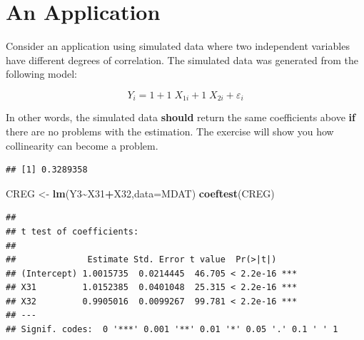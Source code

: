 \documentclass[
]{book}
\newenvironment{Shaded}{\begin{snugshade}}{\end{snugshade}}
\newcommand{\AttributeTok}[1]{\textcolor[rgb]{0.13,0.29,0.53}{#1}}
\newcommand{\CommentTok}[1]{\textcolor[rgb]{0.56,0.35,0.01}{\textit{#1}}}
\newcommand{\FunctionTok}[1]{\textcolor[rgb]{0.13,0.29,0.53}{\textbf{#1}}}
\newcommand{\NormalTok}[1]{#1}
\newcommand{\OtherTok}[1]{\textcolor[rgb]{0.56,0.35,0.01}{#1}}
\newcommand{\SpecialCharTok}[1]{\textcolor[rgb]{0.81,0.36,0.00}{\textbf{#1}}}
\begin{document}
\section{An Application}\label{an-application-1}

Consider an application using simulated data where two independent variables have different degrees of correlation. The simulated data was generated from the following model:

\[Y_i = 1 + 1 \;X_{1i} + 1\; X_{2i} + \varepsilon_i\]

In other words, the simulated data \textbf{should} return the same coefficients above \textbf{if} there are no problems with the estimation. The exercise will show you how collinearity can become a problem.

\begin{Shaded}
\end{Shaded}

\begin{verbatim}
## [1] 0.3289358
\end{verbatim}

\begin{Shaded}
\begin{Highlighting}[]
\NormalTok{CREG }\OtherTok{\textless{}{-}} \FunctionTok{lm}\NormalTok{(Y3}\SpecialCharTok{\textasciitilde{}}\NormalTok{X31}\SpecialCharTok{+}\NormalTok{X32,}\AttributeTok{data=}\NormalTok{MDAT)}
\FunctionTok{coeftest}\NormalTok{(CREG)}
\end{Highlighting}
\end{Shaded}

\begin{verbatim}
## 
## t test of coefficients:
## 
##              Estimate Std. Error t value  Pr(>|t|)    
## (Intercept) 1.0015735  0.0214445  46.705 < 2.2e-16 ***
## X31         1.0152385  0.0401048  25.315 < 2.2e-16 ***
## X32         0.9905016  0.0099267  99.781 < 2.2e-16 ***
## ---
## Signif. codes:  0 '***' 0.001 '**' 0.01 '*' 0.05 '.' 0.1 ' ' 1
\end{verbatim}

\begin{Shaded}
\end{Shaded}
\end{document}
